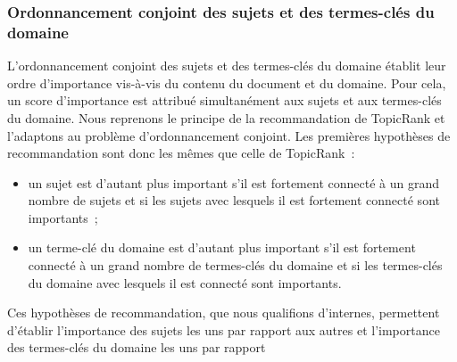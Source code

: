       \subsubsection{Ordonnancement conjoint des sujets et des termes-clés du domaine}
      \label{subsubsec:main-domain_specific_keyphrase_annotation-supervised_automatic_keyphrase_extraction-topiccorank-co_ranking}
        L'ordonnancement conjoint des sujets et des termes-clés du domaine
        établit leur ordre d'importance vis-à-vis du contenu du document et du
        domaine. Pour cela, un score d'importance est attribué simultanément aux
        sujets et aux termes-clés du domaine.
%
        Nous reprenons le principe de la recommandation de TopicRank et
        l'adaptons au problème d'ordonnancement conjoint. Les premières
        hypothèses de recommandation sont donc les mêmes que celle de
        TopicRank~:
        \begin{itemize}
          \item{un sujet est d'autant plus important s'il est fortement connecté
                à un grand nombre de sujets et si les sujets avec lesquels il
                est fortement connecté sont importants~;}
          \item{un terme-clé du domaine est d'autant plus important s'il est
                fortement connecté à un grand nombre de termes-clés du domaine
                et si les termes-clés du domaine avec lesquels il est connecté
                sont importants.}
        \end{itemize}
        Ces hypothèses de recommandation, que nous qualifions d'internes,
        permettent d'établir l'importance des sujets les uns par rapport aux
        autres et l'importance des termes-clés du domaine les uns par rapport
